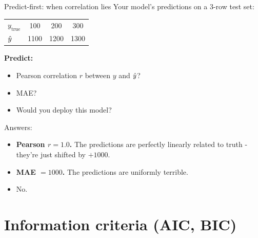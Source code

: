 \documentclass[aspectratio=169]{beamer}
\begin{document}
\begin{frame}{Predict-first: when correlation lies}
  Your model's predictions on a 3-row test set:
  \vskip 4pt
  \begin{center}\small
    \begin{tabular}{lccc}
      $y_\text{true}$ & 100 & 200 & 300 \\
      $\hat{y}$           & 1100 & 1200 & 1300 \\
    \end{tabular}
  \end{center}
  \vfill
  \pause
  \textbf{Predict:}
  \begin{itemize}
    \item Pearson correlation $r$ between $y$ and $\hat{y}$?
    \item MAE?
    \item Would you deploy this model?
  \end{itemize}
  \pause
  \vfill
  Answers:
  \begin{itemize}
    \item \textbf{Pearson $r = 1.0$.} The predictions are perfectly linearly related to truth - they're just shifted by $+1000$.
    \item \textbf{MAE $= 1000$.} The predictions are uniformly terrible.
    \item No.
  \end{itemize}
  \vfill
\end{frame}

\section{Information criteria (AIC, BIC)}
\end{document}
